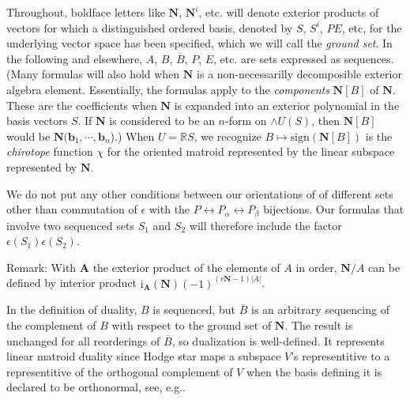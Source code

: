 \documentclass[Unicode]{cedram-alco}
\newcommand{\ext}[1]{\ensuremath{\mathbf{#1}}}
\begin{document}
Throughout, boldface letters like $\ext{N}$, $\ext{N}^{i}$, etc. will denote
exterior products of vectors for which a distinguished ordered
basis, denoted by $S$, $S^{i}$, $PE$, etc,
for the underlying vector space has been specified, which we will
call the \emph{ground set}.
In the following
and elsewhere, $A$, $B$, $\overline{B}$, $P$, $E$, etc. are sets
expressed as sequences.
(Many formulas will also
hold when $\ext{N}$ is a non-necessarilly decomposible exterior algebra element.
Essentially, the formulas apply to the \emph{components} $\ext{N}[B]$ of $\ext{N}$.  These
are the coefficients when $\ext{N}$ is expanded into an exterior polynomial
in the basis vectors $S$.  If $\ext{N}$ is considered to be an $n$-form on $\wedge U(S)$,
then $\ext{N}[B]$ would be $\ext{N}(\ext{b}_1, \cdots, \ext{b}_n$).)
When $U=\mathbb{R}S$, we recognize $B\mapsto\text{sign}(\ext{N}[B])$
is the \emph{chirotope} function $\chi$ for the oriented matroid represented by the
linear subspace represented by $\ext{N}$.

We do not put any other conditions between our orientations of
of different sets other than commutation of $\epsilon$ with the
$P \leftrightarrow P_{\alpha}\leftrightarrow P_{\beta}$ bijections.
Our formulas that involve two sequenced sets $S_1$
and $S_2$ will therefore include the factor $\epsilon(S_1)\epsilon(S_2)$.

Remark: With $\ext{A}$ the exterior product of the elements of $A$ in order, $\ext{N}/A$
can be defined by interior product\cite{MarcusFDMuAlPt2}
$\text{i}_{\ext{A}}(\ext{N})(-1)^{(r\ext{N}-1)|A|}$.


    In the definition of duality, $B$ is sequenced,
    but $\overline{B}$ is an arbitrary sequencing of the complement of $B$
    with respect to the ground set of $\ext{N}$.
    The result is unchanged for all reorderings of $\overline{B}$,
    so dualization is well-defined.  It represents linear matroid duality
    since Hodge star maps a subspace $V$'s representitive to a representitive
    of the orthogonal complement of $V$ when the basis defining it is
    declared to be orthonormal, see, e.g.\cite{MarcusFDMuAlPt2}.





\end{document}
